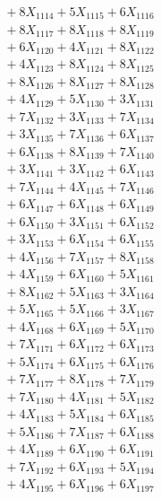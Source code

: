 \documentclass[a4paper,10pt]{article}
\begin{document}
{\begin{align}
&\;  + 8 X_{1114} + 5 X_{1115} + 6 X_{1116} \\[0.3ex]
&\;  + 8 X_{1117} + 8 X_{1118} + 8 X_{1119} \\[0.5ex]\allowbreak
&\;  + 6 X_{1120} + 4 X_{1121} + 8 X_{1122} \\[0.3ex]
&\;  + 4 X_{1123} + 8 X_{1124} + 8 X_{1125} \\[0.3ex]
&\;  + 8 X_{1126} + 8 X_{1127} + 8 X_{1128} \\[0.3ex]
&\;  + 4 X_{1129} + 5 X_{1130} + 3 X_{1131} \\[0.3ex]
&\;  + 7 X_{1132} + 3 X_{1133} + 7 X_{1134} \\[0.3ex]
&\;  + 3 X_{1135} + 7 X_{1136} + 6 X_{1137} \\[0.3ex]
&\;  + 6 X_{1138} + 8 X_{1139} + 7 X_{1140} \\[0.3ex]
&\;  + 3 X_{1141} + 3 X_{1142} + 6 X_{1143} \\[0.3ex]
&\;  + 7 X_{1144} + 4 X_{1145} + 7 X_{1146} \\[0.3ex]
&\;  + 6 X_{1147} + 6 X_{1148} + 6 X_{1149} \\[0.5ex]\allowbreak
&\;  + 6 X_{1150} + 3 X_{1151} + 6 X_{1152} \\[0.3ex]
&\;  + 3 X_{1153} + 6 X_{1154} + 6 X_{1155} \\[0.3ex]
&\;  + 4 X_{1156} + 7 X_{1157} + 8 X_{1158} \\[0.3ex]
&\;  + 4 X_{1159} + 6 X_{1160} + 5 X_{1161} \\[0.3ex]
&\;  + 8 X_{1162} + 5 X_{1163} + 3 X_{1164} \\[0.3ex]
&\;  + 5 X_{1165} + 5 X_{1166} + 3 X_{1167} \\[0.3ex]
&\;  + 4 X_{1168} + 6 X_{1169} + 5 X_{1170} \\[0.3ex]
&\;  + 7 X_{1171} + 6 X_{1172} + 6 X_{1173} \\[0.3ex]
&\;  + 5 X_{1174} + 6 X_{1175} + 6 X_{1176} \\[0.3ex]
&\;  + 7 X_{1177} + 8 X_{1178} + 7 X_{1179} \\[0.5ex]\allowbreak
&\;  + 7 X_{1180} + 4 X_{1181} + 5 X_{1182} \\[0.3ex]
&\;  + 4 X_{1183} + 5 X_{1184} + 6 X_{1185} \\[0.3ex]
&\;  + 5 X_{1186} + 7 X_{1187} + 6 X_{1188} \\[0.3ex]
&\;  + 4 X_{1189} + 6 X_{1190} + 6 X_{1191} \\[0.3ex]
&\;  + 7 X_{1192} + 6 X_{1193} + 5 X_{1194} \\[0.3ex]
&\;  + 4 X_{1195} + 6 X_{1196} + 6 X_{1197} \\[0.3ex]

\end{align}}
\end{document}
